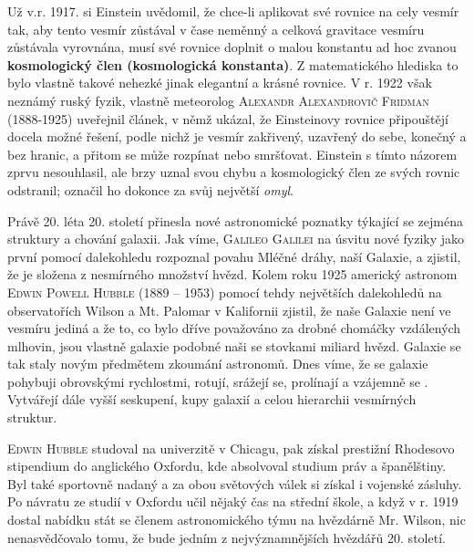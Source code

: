         Už v.r. 1917. si Einstein uvědomil, že chce-li aplikovat své rovnice na cely vesmír tak, aby
        tento vesmír zůstával v čase neměnný a celková gravitace vesmíru zůstávala vyrovnána, musí
        své rovnice doplnit o malou konstantu ad hoc zvanou \textbf{kosmologický člen (kosmologická
        konstanta)}. Z matematického hlediska to bylo vlastně takové nehezké  jinak
        elegantní a krásné rovnice. V r. 1922 však neznámý ruský fyzik, vlastně meteorolog
        \textsc{Alexandr Alexandrovič Fridman} (1888-1925) uveřejnil článek, v němž ukázal, že
        Einsteinovy rovnice připouštějí docela možné řešení, podle nichž je vesmír zakřivený,
        uzavřený do sebe, konečný a bez hranic, a přitom se může rozpínat nebo smršťovat. Einstein s
        tímto názorem zprvu nesouhlasil, ale brzy uznal svou chybu a kosmologický člen ze svých
        rovnic odstranil; označil ho dokonce za svůj největší \emph{omyl}. 
        
        Právě 20. léta 20. století přinesla nové astronomické poznatky týkající se zejména struktury
        a chování galaxii. Jak víme, \textsc{Galileo Galilei} na úsvitu nové fyziky jako první
        pomocí dalekohledu rozpoznal povahu Mléčné dráhy, naší Galaxie, a zjistil, že je složena z
        nesmírného množství hvězd. Kolem roku 1925 americký astronom \textsc{Edwin Powell Hubble}
        (1889 – 1953) pomocí tehdy největších dalekohledů na observatořích Wilson a Mt. Palomar v
        Kalifornii zjistil, že naše Galaxie není ve vesmíru jediná a že to, co bylo dříve považováno
        za drobné chomáčky vzdálených mlhovin, jsou vlastně galaxie podobné naši se stovkami miliard
        hvězd. Galaxie se tak staly novým předmětem zkoumání astronomů. Dnes víme, že se galaxie
        pohybuji obrovskými rychlostmi, rotují, srážejí se, prolínají a vzájemně se .
        Vytvářejí dále vyšší seskupení, kupy galaxií a celou hierarchii vesmírných struktur.
        
        \textsc{Edwin Hubble} studoval na univerzitě v Chicagu, pak získal prestižní Rhodesovo
        stipendium do anglického Oxfordu, kde absolvoval studium práv a španělštiny. Byl také
        sportovně nadaný a za obou světových válek si získal i vojenské zásluhy. Po návratu ze
        studií v Oxfordu učil nějaký čas na střední škole, a když v r. 1919 dostal nabídku stát se
        členem astronomického týmu na hvězdárně Mr. Wilson, nic nenasvědčovalo tomu, že bude jedním
        z nejvýznamnějších hvězdářů 20. století.

